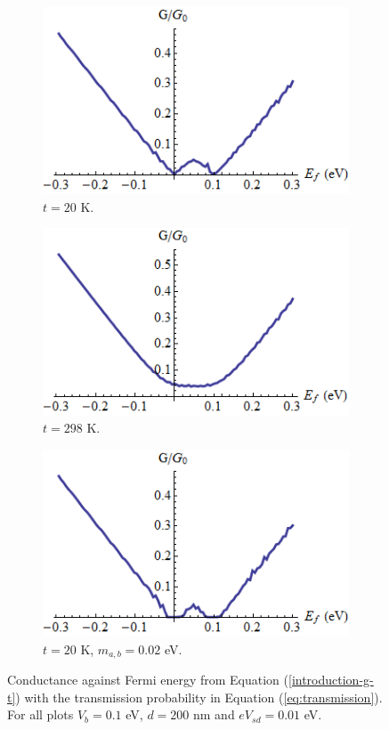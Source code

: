 \documentclass[12pt,a4paper]{report}
\begin{document}
		\begin{figure}[h]
			 \begin{subfigure}[h]{0.3\textwidth}
				\centerline{\includegraphics[scale=0.35]{images/pot-g-1}}
				\caption{$t=20$ K.}
			\end{subfigure}
			\hspace{0.5cm}
			\begin{subfigure}[h]{0.3\textwidth}
				\centerline{\includegraphics[scale=0.35]{images/pot-g-2}}
				\caption{$t=298$ K.}
			\end{subfigure}
			\hspace{0.5cm}
			\begin{subfigure}[h]{0.3\textwidth}
				\centerline{\includegraphics[scale=0.35]{images/pot-g-3}}
				\caption{$t=20$ K, $m_{a,b}=0.02$ eV.}
			\end{subfigure}
			\caption{Conductance against Fermi energy from Equation (\ref{introduction-g-t}) with the transmission probability in Equation (\ref{eq:transmission}). For all plots $V_{b}=0.1$ eV, $d=200$ nm and $eV_{sd}=0.01$ eV.}
			\label{pot-g-1}
		\end{figure}
\end{document}
